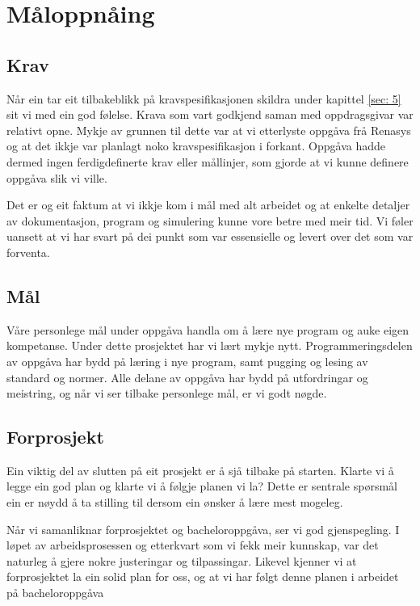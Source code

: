 \section{Måloppnåing}
\thispagestyle{fancy}

\subsection{Krav}
Når ein tar eit tilbakeblikk på kravspesifikasjonen skildra under kapittel \ref{sec: 5} sit vi med ein god følelse.
Krava som vart godkjend saman med oppdragsgivar var relativt opne.
Mykje av grunnen til dette var at vi etterlyste oppgåva frå \gls{Renasys} og at det ikkje var planlagt noko kravspesifikasjon i forkant. \newline
Oppgåva hadde dermed ingen ferdigdefinerte krav eller mållinjer, som gjorde at vi kunne definere oppgåva slik vi ville.

Det er og eit faktum at vi ikkje kom i mål med alt arbeidet og at enkelte detaljer av dokumentasjon, program og simulering
kunne vore betre med meir tid.
Vi føler uansett at vi har svart på dei punkt som var essensielle og levert over det som var forventa.



\subsection{Mål}
Våre personlege mål under oppgåva handla om å lære nye program og auke eigen kompetanse. Under dette prosjektet har vi lært mykje nytt. 
Programmeringsdelen av oppgåva har bydd på læring i nye program, samt pugging og lesing av standard og normer.
Alle delane av oppgåva har bydd på utfordringar og meistring, og når vi ser tilbake personlege mål, er vi godt nøgde.

\subsection{Forprosjekt}
Ein viktig del av slutten på eit prosjekt er å sjå tilbake på starten.
Klarte vi å legge ein god plan og klarte vi å følgje planen vi la?
Dette er sentrale spørsmål ein er nøydd å ta stilling til dersom ein ønsker å lære mest mogeleg.

Når vi samanliknar forprosjektet og bacheloroppgåva, ser vi god gjenspegling. 
I løpet av arbeidsprosessen og etterkvart som vi fekk meir kunnskap, var det naturleg å gjere nokre justeringar og tilpassingar. 
Likevel kjenner vi at forprosjektet la ein solid plan for oss, og at vi har følgt denne planen i arbeidet på bacheloroppgåva



\newpage